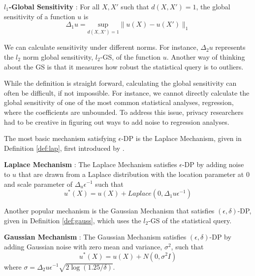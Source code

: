\begin{defn}\label{def:gs} \textbf{$l_1$-Global Sensitivity} \autocite{dwork2006calibrating}:
For all $X,X'$ such that $d(X,X')=1$, the global sensitivity of a function $u$ is
    \begin{equation}\label{eqn:gs}
        \Delta_1 u= \underset{d(X,X')=1}{\text{sup}} \|u(X)-u(X') \|_1 
    \end{equation}
\end{defn}

We can calculate sensitivity under different norms. For instance, $\Delta_2 u$ represents the $l_2$ norm global sensitivity, $l_2$-GS, of the function $u$. Another way of thinking about the GS is that it measures how robust the statistical query is to outliers.

While the definition is straight forward, calculating the global sensitivity can often be difficult, if not impossible. For instance, we cannot directly calculate the global sensitivity of one of the most common statistical analyses, regression, where the coefficients are unbounded. To address this issue, privacy researchers had to be creative in figuring out ways to add noise to regression analyses.

The most basic mechanism satisfying $\epsilon$-DP is the Laplace Mechanism, given in Definition \ref{def:lap}, first introduced by \cite{dwork2006calibrating}.

\begin{defn}\textbf{Laplace Mechanism} \autocite{dwork2006calibrating}: \label{def:lap}
The Laplace Mechanism satisfies $\epsilon$-DP by adding noise to $u$ that are drawn from a Laplace distribution with the location parameter at 0 and scale parameter of $\Delta_u\epsilon^{-1}$ such that 
    \begin{equation}\label{eqn:lap}
        u^\ast(X)=u(X)+Laplace\left(0,\Delta_1 u \epsilon^{-1}\right)
    \end{equation}
\end{defn}

Another popular mechanism is the Gaussian Mechanism that satisfies $(\epsilon, \delta)$-DP, given in Definition \ref{def:gauss}, which uses the $l_2$-GS of the statistical query.

\begin{defn}\label{def:gauss} \textbf{Gaussian Mechanism} \autocite{dwork2014algorithmic}:
    The Gaussian Mechanism satisfies $(\epsilon,\delta)$-DP by adding Gaussian noise with zero mean and variance, $\sigma^2$, such that
        \begin{equation}\label{eqn:gauss}
            u^\ast(X)=u(X)+N\left(0, \sigma^2 I \right)
        \end{equation}
    where $\sigma=\Delta_2 u \epsilon^{-1} \sqrt{2 \log(1.25/\delta)}$. 
\end{defn}

